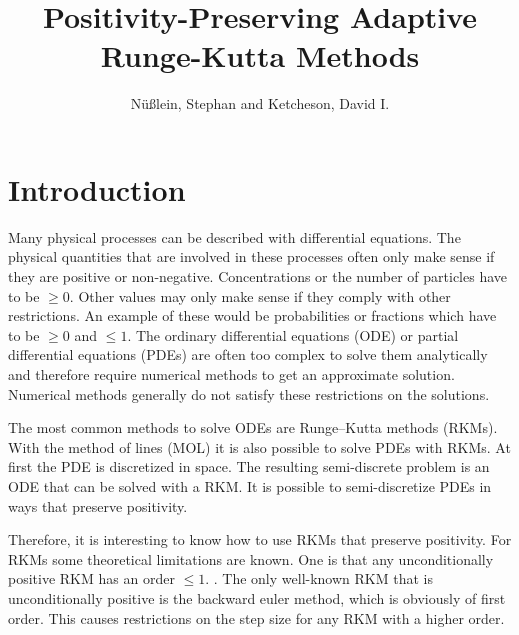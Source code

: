 \documentclass[a4paper]{scrartcl}
\title{Positivity-Preserving Adaptive Runge-Kutta Methods}
\author{Nüßlein, Stephan and Ketcheson, David I.}
\numberwithin{equation}{section}
\theoremstyle{plain}
\theoremstyle{definition}
\numberwithin{theorem}{section}
\newcommand{\1}{\mathbbm{1}}
\begin{document}
\maketitle

\section{Introduction}


Many physical processes can be described with differential equations. 
The physical quantities that are involved in these processes often only make sense if they are positive or non-negative. 
Concentrations or the number of particles have to be $\geq 0$.
Other values may only make sense if they comply with other restrictions. An example of these would be probabilities or fractions which have to be $\geq 0$ and $\leq 1$.
The ordinary differential equations (ODE) or partial differential equations (PDEs) are often too complex to solve them analytically and therefore require numerical methods to get an approximate solution.
Numerical methods generally do not satisfy these restrictions on the solutions.

The most common methods to solve ODEs are Runge–Kutta methods (RKMs). 
With the method of lines (MOL) it is also possible to solve PDEs with RKMs.
At first the PDE is discretized in space. The resulting semi-discrete problem is an ODE that can be solved with a RKM. 
It is possible to semi-discretize PDEs in ways that preserve positivity\cite{kopecz_comparison_2019,kopecz_unconditionally_2018}.

Therefore, it is interesting to know how to use RKMs that preserve positivity.
For RKMs some theoretical limitations are known. One is that any unconditionally positive RKM has an order $\leq 1$. \cite{hundsdorfer_numerical_2003,bolley_conservation_1978,horvath_positivity_1998}. The only well-known RKM that is unconditionally positive is the backward euler method, which is obviously of first order. 
This causes restrictions on the step size for any RKM with a higher order.
\end{document}
